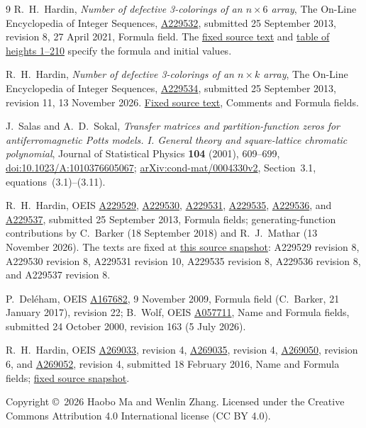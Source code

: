 \documentclass[11pt,a4paper]{article}
\begin{document}
\begin{thebibliography}{9}
R.\ H.\ Hardin, \emph{Number of defective 3-colorings of an
$n\times6$ array}, The On-Line Encyclopedia of Integer Sequences,
\href{https://oeis.org/A229532}{A229532}, submitted 25 September 2013,
revision 8, 27 April 2021, Formula field.
The \href{https://github.com/oeis/oeisdata/blob/571197984aeda7b8b680fe3a1f6a43f9898cd441/seq/A229/A229532.seq}{fixed source text}
and \href{https://oeis.org/A229532/b229532.txt}{table of heights 1--210}
specify the formula and initial values.

R.\ H.\ Hardin, \emph{Number of defective 3-colorings of an
$n\times k$ array}, The On-Line Encyclopedia of Integer Sequences,
\href{https://oeis.org/A229534}{A229534}, submitted 25 September 2013,
revision 11, 13 November 2026.
\href{https://github.com/oeis/oeisdata/blob/49db7744e1fdbefbe376d1d018370c017d4c288b/seq/A229/A229534.seq}{Fixed source text},
Comments and Formula fields.

J.\ Salas and A.\ D.\ Sokal, \emph{Transfer matrices and partition-function
zeros for antiferromagnetic Potts models. I. General theory and
square-lattice chromatic polynomial}, Journal of Statistical Physics
\textbf{104} (2001), 609--699,
\href{https://doi.org/10.1023/A:1010376605067}{doi:10.1023/A:1010376605067};
\href{https://arxiv.org/abs/cond-mat/0004330v2}{arXiv:cond-mat/0004330v2},
Section~3.1, equations~(3.1)--(3.11).

R.\ H.\ Hardin, OEIS
\href{https://oeis.org/A229529}{A229529},
\href{https://oeis.org/A229530}{A229530},
\href{https://oeis.org/A229531}{A229531},
\href{https://oeis.org/A229535}{A229535},
\href{https://oeis.org/A229536}{A229536}, and
\href{https://oeis.org/A229537}{A229537}, submitted 25 September 2013,
Formula fields; generating-function contributions by
C.\ Barker (18 September 2018) and R.\ J.\ Mathar (13 November 2026).
The texts are fixed at
\href{https://github.com/oeis/oeisdata/tree/49db7744e1fdbefbe376d1d018370c017d4c288b/seq/A229}{this source snapshot}:
A229529 revision 8, A229530 revision 8, A229531 revision 10,
A229535 revision 8, A229536 revision 8, and A229537 revision 8.

P.\ Del\'eham, OEIS \href{https://oeis.org/A167682}{A167682},
9 November 2009, Formula field (C.\ Barker, 21 January 2017), revision 22;
B.~Wolf, OEIS \href{https://oeis.org/A057711}{A057711}, Name and Formula fields,
submitted 24 October 2000, revision 163 (5 July 2026).

R.\ H.\ Hardin, OEIS
\href{https://oeis.org/A269033}{A269033}, revision 4,
\href{https://oeis.org/A269035}{A269035}, revision 4,
\href{https://oeis.org/A269050}{A269050}, revision 6, and
\href{https://oeis.org/A269052}{A269052}, revision 4,
submitted 18 February 2016, Name and Formula fields;
\href{https://github.com/oeis/oeisdata/tree/49db7744e1fdbefbe376d1d018370c017d4c288b/seq/A269}{fixed source snapshot}.
\end{thebibliography}

\medskip
\noindent\small
Copyright \copyright\ 2026 Haobo Ma and Wenlin Zhang.
Licensed under the Creative Commons Attribution 4.0 International
license (CC BY 4.0).
\end{document}
